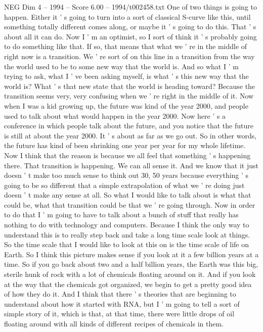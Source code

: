 \begin{textsample}{NEG Dim 4 – 1994 – Score 6.00 – 1994/t002458.txt}
One of two things is going to happen.
Either it ' s going to turn into a sort of classical S-curve like this, until something totally different comes along, or maybe it ' s going to do this.
That ' s about all it can do.
Now I ' m an optimist, so I sort of think it ' s probably going to do something like that.
If so, that means that what we ' re in the middle of right now is a transition.
We ' re sort of on this line in a transition from the way the world used to be to some new way that the world is.
And so what I ' m trying to ask, what I ' ve been asking myself, is what ' s this new way that the world is?
What ' s that new state that the world is heading toward?
Because the transition seems very, very confusing when we ' re right in the middle of it.
Now when I was a kid growing up, the future was kind of the year 2000, and people used to talk about what would happen in the year 2000.
Now here ' s a conference in which people talk about the future, and you notice that the future is still at about the year 2000.
It ' s about as far as we go out.
So in other words, the future has kind of been shrinking one year per year for my whole lifetime.
Now I think that the reason is because we all feel that something ' s happening there.
That transition is happening.
We can all sense it.
And we know that it just doesn ' t make too much sense to think out 30, 50 years because everything ' s going to be so different that a simple extrapolation of what we ' re doing just doesn ' t make any sense at all.
So what I would like to talk about is what that could be, what that transition could be that we ' re going through.
Now in order to do that I ' m going to have to talk about a bunch of stuff that really has nothing to do with technology and computers.
Because I think the only way to understand this is to really step back and take a long time scale look at things.
So the time scale that I would like to look at this on is the time scale of life on Earth.
So I think this picture makes sense if you look at it a few billion years at a time.
So if you go back about two and a half billion years, the Earth was this big, sterile hunk of rock with a lot of chemicals floating around on it.
And if you look at the way that the chemicals got organized, we begin to get a pretty good idea of how they do it.
And I think that there ' s theories that are beginning to understand about how it started with RNA, but I ' m going to tell a sort of simple story of it, which is that, at that time, there were little drops of oil floating around with all kinds of different recipes of chemicals in them.

\end{textsample}
